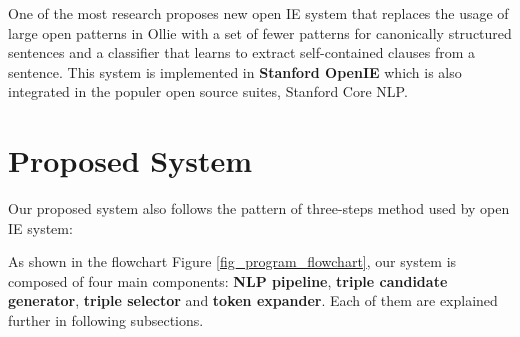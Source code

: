 \documentclass[peerreview,12pt]{IEEEtran}
\begin{document}
One of the most research proposes new open IE system that replaces the usage of large open patterns in Ollie\cite{schmitz2012open} with a set of fewer patterns for canonically structured sentences and a classifier that learns to extract self-contained clauses from a sentence\cite{angeli2015leveraging}. This system is implemented in \textbf{Stanford OpenIE} which is also integrated in the populer open source suites, Stanford Core NLP.

\section{Proposed System}

Our proposed system also follows the pattern of three-steps\cite{etzioni2011open} method used by open IE system:


As shown in the flowchart Figure \ref{fig_program_flowchart}, our system is composed of four main components: \textbf{NLP pipeline}, \textbf{triple candidate generator}, \textbf{triple selector} and \textbf{token expander}. Each of them are explained further in following subsections.
\end{document}
